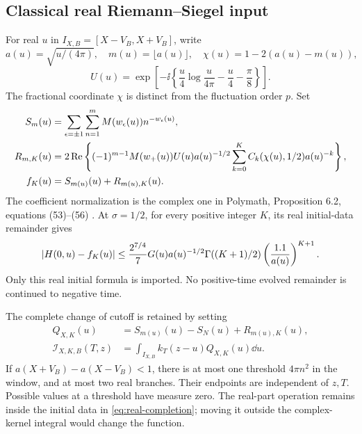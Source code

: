 \subsection{Classical real Riemann--Siegel input}
\label{subsec:rs-input}
For real \(u\) in \(I_{X,B}=[X-V_B,X+V_B]\), write
\[
 a(u)=\sqrt{u/(4\pi)},\quad m(u)=\lfloor a(u)\rfloor,\quad
 \chi(u)=1-2(a(u)-m(u)),
\]
\[
 U(u)=\exp\left[-\ii\left\{\frac u4\log\frac u{4\pi}
                                   -\frac u4-\frac{\pi}{8}\right\}\right].
\]
The fractional coordinate \(\chi\) is distinct from the fluctuation
order \(p\). Set
\begin{subequations}\label{eq:real-completion}
\begin{align}
 S_m(u)&=\sum_{\epsilon=\pm1}\sum_{n=1}^m
                 M(w_\epsilon(u))n^{-w_\epsilon(u)},\\
 R_{m,K}(u)&=2\operatorname{Re}\left\{(-1)^{m-1}M(w_+(u))U(u)a(u)^{-1/2}
                 \sum_{k=0}^{K}C_k(\chi(u),1/2)a(u)^{-k}\right\},\\
 f_K(u)&=S_{m(u)}(u)+R_{m(u),K}(u).
\end{align}
\end{subequations}
The coefficient normalization is the complex one in Polymath,
Proposition 6.2, equations (53)--(56) \cite{polymath}.
At \(\sigma=1/2\), for every positive integer \(K\), its
real initial-data remainder gives
\begin{equation}
 \lvert H(0,u)-f_K(u)\rvert
 \le\frac{2^{7/4}}7G(u)a(u)^{-1/2}
       \Gamma((K+1)/2)\left(\frac{1.1}{a(u)}\right)^{K+1}.
 \label{eq:rs-remainder}
\end{equation}
Only this real initial formula is imported. No positive-time
evolved remainder is continued to negative time.

The complete change of cutoff is retained by setting
\begin{subequations}\label{eq:retained-integral}
\begin{align}
 Q_{X,K}(u)&=S_{m(u)}(u)-S_N(u)+R_{m(u),K}(u),\\
 \mathcal I_{X,K,B}(T,z)&=\int_{I_{X,B}}k_T(z-u)Q_{X,K}(u)\dd u.
\end{align}
\end{subequations}
If \(a(X+V_B)-a(X-V_B)<1\), there is at most one threshold
\(4\pi n^2\) in the window, and at most two real branches.
Their endpoints are independent of \(z,T\). Possible values at a
threshold have measure zero. The real-part operation remains inside
the initial data in \eqref{eq:real-completion}; moving it outside
the complex-kernel integral would change the function.

